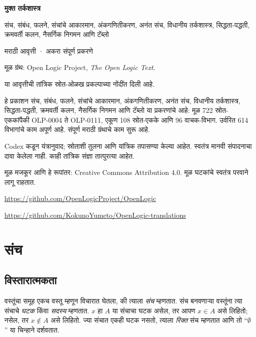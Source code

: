 \documentclass[11pt,a4paper,openany]{book}
\theoremstyle{definition}
\begin{document}
\begin{titlepage}
\vspace*{2cm}
{\Huge\bfseries मुक्त तर्कशास्त्र\par}
\vspace{1cm}
{\LARGE संच, संबंध, फलने, संचांचे आकारमान, अंकगणितीकरण, अनंत संच, विधानीय तर्कशास्त्र, सिद्धता-पद्धती, क्रमवर्ती कलन, नैसर्गिक निगमन आणि टॅब्लो\par}
\vspace{1cm}
{\large मराठी आवृत्ती · अकरा संपूर्ण प्रकरणे\par}
\vfill
मूळ ग्रंथ: Open Logic Project, \textit{The Open Logic Text}.\par
या आवृत्तीची तांत्रिक स्रोत-ओळख प्रकल्पाच्या नोंदींत दिली आहे.\par
हे प्रकाशन संच, संबंध, फलने, संचांचे आकारमान, अंकगणितीकरण, अनंत संच, विधानीय तर्कशास्त्र, सिद्धता-पद्धती, क्रमवर्ती कलन, नैसर्गिक निगमन आणि टॅब्लो या प्रकरणांचे आहे: मूळ 722 स्रोत-एककांपैकी OLP-0004 ते OLP-0111, एकूण 108 स्रोत-एकके आणि 96 वाचक-विभाग. उर्वरित 614 विभागांचे काम अपूर्ण आहे.
संपूर्ण मराठी ग्रंथाचे काम सुरू आहे.\par
Codex कडून यंत्रानुवाद; स्रोताशी तुलना आणि यांत्रिक तपासण्या केल्या आहेत.
स्वतंत्र मानवी संपादनाचा दावा केलेला नाही. काही तांत्रिक संज्ञा तात्पुरत्या आहेत.\par
मूळ मजकूर आणि हे रूपांतर: Creative Commons Attribution 4.0.
मूळ घटकांचे स्वतंत्र परवाने लागू राहतात.\par
\url{https://github.com/OpenLogicProject/OpenLogic}\par
\url{https://github.com/KokunoYumeto/OpenLogic-translations}
\end{titlepage}
\tableofcontents
\chapter{संच}








\section{विस्तारात्मकता}\label{sfr:set:bas:sec}

वस्तूंचा समूह एकच वस्तू {म्हणून} विचारात घेतला, की त्याला \emph{संच} म्हणतात.
संच बनवणाऱ्या वस्तूंना त्या संचाचे \emph{घटक} किंवा \emph{सदस्य} म्हणतात.
$x$ हा $A$ या संचाचा घटक असेल, तर आपण $x \in A$ असे लिहितो;
नसेल, तर $x \notin A$ असे लिहितो. ज्या संचात एकही घटक नसतो,
त्याला \emph{रिक्त} संच म्हणतात आणि तो ``$\emptyset$'' या चिन्हाने दर्शवतात.
\end{document}
